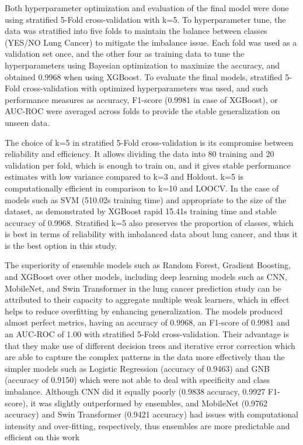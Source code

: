 \documentclass[runningheads]{llncs}
\begin{document}
Both hyperparameter optimization and evaluation of the final model were done using stratified 5-Fold cross-validation with k=5. To hyperparameter tune, the data was stratified into five folds to maintain the balance between classes (YES/NO Lung Cancer) to mitigate the imbalance issue. Each fold was used as a validation set once, and the other four as training data to tune the hyperparameters using Bayesian optimization to maximize the accuracy, and obtained 0.9968 when using XGBoost. To evaluate the final models, stratified 5-Fold cross-validation with optimized hyperparameters was used, and such performance measures as accuracy, F1-score (0.9981 in case of XGBoost), or AUC-ROC were averaged across folds to provide the stable generalization on unseen data.

The choice of k=5 in stratified 5-Fold cross-validation is its compromise between reliability and efficiency. It allows dividing the data into 80 training  and 20 validation  per fold, which is enough to train on, and it gives stable performance estimates with low variance compared to k=3 and Holdout. k=5 is computationally efficient in comparison to k=10 and LOOCV. In the case of models such as SVM (510.02s training time) and appropriate to the size of the dataset, as demonstrated by XGBoost rapid 15.41s training time and stable accuracy of 0.9968. Stratified k=5 also preserves the proportion of classes, which is best in terms of reliability with imbalanced data about lung cancer, and thus it is the best option in this study.

The superiority of ensemble models such as Random Forest, Gradient Boosting, and XGBoost over other models, including deep learning models such as CNN, MobileNet, and Swin Transformer in the lung cancer prediction study can be attributed to their capacity to aggregate multiple weak learners, which in effect helps to reduce overfitting by enhancing generalization. The models produced almost perfect metrics, having an accuracy of 0.9968, an F1-score of 0.9981 and an AUC-ROC of 1.00 with stratified 5-Fold cross-validation. Their advantage is that they make use of different decision trees and iterative error correction which are able to capture the complex patterns in the data more effectively than the simpler models such as Logistic Regression (accuracy of 0.9463) and GNB (accuracy of 0.9150) which were not able to deal with specificity and class imbalance. Although CNN did it equally poorly (0.9838 accuracy, 0.9927 F1-score), it was slightly outperformed by ensembles, and MobileNet (0.9762 accuracy) and Swin Transformer (0.9421 accuracy) had issues with computational intensity and over-fitting, respectively, thus ensembles are more predictable and efficient on this work
\end{document}
